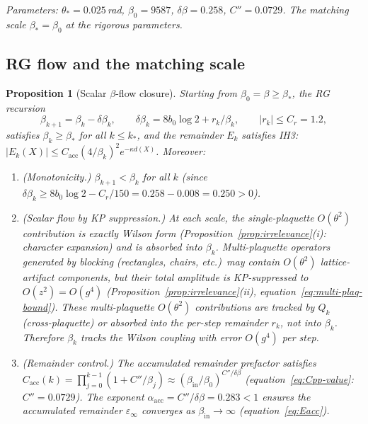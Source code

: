 \documentclass[11pt]{article}
\newtheorem{proposition}[theorem]{Proposition}
\theoremstyle{definition}
\begin{document}
\noindent\emph{Parameters: $\theta_*=0.025$\,rad,
$\beta_0=9587$, $\delta\beta=0.258$, $C''=0.0729$.
The matching scale $\beta_*=\beta_0$ at the rigorous parameters.}

\medskip
\subsection{RG flow and the matching scale}

\begin{proposition}[Scalar $\beta$-flow closure]%
\label{prop:beta-flow}
Starting from $\beta_0=\beta\ge\beta_*$, the RG recursion
\begin{equation}\label{eq:beta-recursion}
\beta_{k+1}=\beta_k-\delta\beta_k,\qquad
\delta\beta_k=8b_0\log 2+r_k/\beta_k,\qquad
|r_k|\le C_r=1.2,
\end{equation}
satisfies $\beta_k\ge\beta_*$ for all $k\le k_*$, and the
remainder $E_k$ satisfies IH3:
$|E_k(X)|\le C_{\mathrm{acc}}(4/\beta_k)^2 e^{-\kappa d(X)}$.
Moreover:
\begin{enumerate}[nosep,label=(\roman*)]
\item \emph{(Monotonicity.)} $\beta_{k+1}<\beta_k$ for all $k$
(since $\delta\beta_k\ge 8b_0\log 2-C_r/150=0.258-0.008=0.250>0$).
\item \emph{(Scalar flow by KP suppression.)}
At each scale, the single-plaquette $O(\theta^2)$ contribution
is exactly Wilson form
(Proposition~\ref{prop:irrelevance}(i): character expansion)
and is absorbed into $\beta_k$.  Multi-plaquette operators
generated by blocking (rectangles, chairs, etc.)\ may
contain $O(\theta^2)$ lattice-artifact components, but their
total amplitude is KP-suppressed to $O(z^2)=O(g^4)$
(Proposition~\ref{prop:irrelevance}(ii),
equation~\eqref{eq:multi-plaq-bound}).  These multi-plaquette
$O(\theta^2)$ contributions are tracked by $Q_k$ (cross-plaquette) or absorbed into the per-step
remainder $r_k$, not into $\beta_k$.  Therefore $\beta_k$
tracks the Wilson coupling with error $O(g^4)$ per step.
\item \emph{(Remainder control.)} The accumulated remainder
prefactor satisfies
$C_{\mathrm{acc}}(k)=\prod_{j=0}^{k-1}(1+C''/\beta_j)
\approx(\beta_{\mathrm{in}}/\beta_0)^{C''/\delta\beta}$
(equation~\eqref{eq:Cpp-value}: $C''=0.0729$).
The exponent $\alpha_{\mathrm{acc}}=C''/\delta\beta=0.283<1$
ensures the accumulated remainder $\varepsilon_\infty$ converges
as $\beta_{\mathrm{in}}\to\infty$
(equation~\eqref{eq:Eacc}).
\end{enumerate}
\end{proposition}
\end{document}
